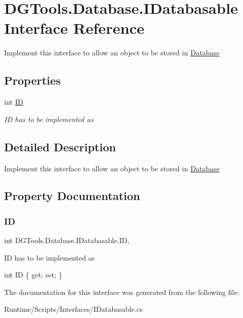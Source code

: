 \hypertarget{interface_d_g_tools_1_1_database_1_1_i_databasable}{}\section{D\+G\+Tools.\+Database.\+I\+Databasable Interface Reference}
\label{interface_d_g_tools_1_1_database_1_1_i_databasable}


Implement this interface to allow an object to be stored in \mbox{\hyperlink{class_d_g_tools_1_1_database_1_1_database}{Database}}  


\subsection*{Properties}
\begin{DoxyCompactItemize}
\item 
int \mbox{\hyperlink{interface_d_g_tools_1_1_database_1_1_i_databasable_aa39b46f8b169816ff854d41945450548}{ID}}
\begin{DoxyCompactList}\small\item\em ID has to be implemented as \end{DoxyCompactList}\end{DoxyCompactItemize}


\subsection{Detailed Description}
Implement this interface to allow an object to be stored in \mbox{\hyperlink{class_d_g_tools_1_1_database_1_1_database}{Database}} 



\subsection{Property Documentation}
\mbox{\label{interface_d_g_tools_1_1_database_1_1_i_databasable_aa39b46f8b169816ff854d41945450548}} 
\subsubsection{\texorpdfstring{ID}{ID}}
{\footnotesize\ttfamily int D\+G\+Tools.\+Database.\+I\+Databasable.\+ID\hspace{0.3cm}{\ttfamily [get]}, {\ttfamily [set]}}



ID has to be implemented as 

{\ttfamily int ID \{ get; set; \}} 

The documentation for this interface was generated from the following file\+:\begin{DoxyCompactItemize}
\item 
Runtime/\+Scripts/\+Interfaces/I\+Databasable.\+cs\end{DoxyCompactItemize}
